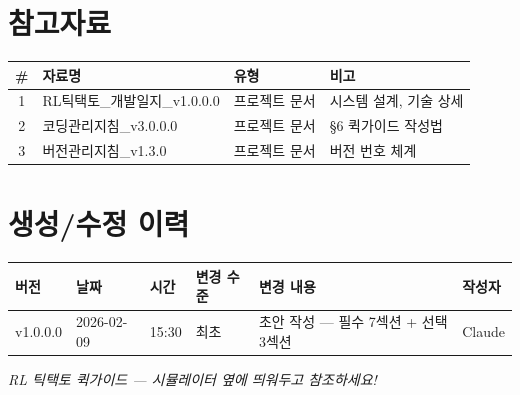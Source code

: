 \documentclass[11pt,a4paper]{article}
\begin{document}
\section*{참고자료}

\begin{center}
\renewcommand{\arraystretch}{1.4}
\begin{tabular}{|c|l|l|l|}
\hline
\rowcolor{tableheader}
\textbf{\#} & \textbf{자료명} & \textbf{유형} & \textbf{비고} \\
\hline
1 & RL틱택토\_개발일지\_v1.0.0.0 & 프로젝트 문서 & 시스템 설계, 기술 상세 \\
\hline
2 & 코딩관리지침\_v3.0.0.0 & 프로젝트 문서 & §6 퀵가이드 작성법 \\
\hline
3 & 버전관리지침\_v1.3.0 & 프로젝트 문서 & 버전 번호 체계 \\
\hline
\end{tabular}
\end{center}

\section*{생성/수정 이력}

\begin{center}
\renewcommand{\arraystretch}{1.3}
\begin{tabular}{|l|l|l|l|p{6cm}|l|}
\hline
\rowcolor{tableheader}
\textbf{버전} & \textbf{날짜} & \textbf{시간} & \textbf{변경 수준} & \textbf{변경 내용} & \textbf{작성자} \\
\hline
v1.0.0.0 & 2026-02-09 & 15:30 & 최초 & 초안 작성 — 필수 7섹션 + 선택 3섹션 & Claude \\
\hline
\end{tabular}
\end{center}

\vfill
\begin{center}
\small\color{lightbrown}
\emph{RL 틱택토 퀵가이드 — 시뮬레이터 옆에 띄워두고 참조하세요!}
\end{center}
\end{document}
